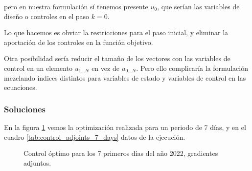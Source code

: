 pero en nuestra formulación sí tenemos presente $u_0$, que serían las variables
de diseño o controles en el paso $k=0$.

Lo que hacemos es obviar la restricciones para el paso inicial, y eliminar la
aportación de los controles en la función objetivo.

Otra posibilidad sería reducir el tamaño de los vectores con las variables de
control en un elemento $u_{1 \ldots N}$ en vez de $u_{0 \ldots N}$. Pero ello
complicaría la formulación mezclando índices distintos para variables de estado
y variables de control en las ecuaciones.


\subsubsection{Soluciones}

En la figura \ref{fig:control_adjoints_7_days} vemos la optimización realizada
para un periodo de 7 días, y en el cuadro \ref{tab:control_adjoints_7_days}
datos de la ejecución.

\begin{figure}[h] \centering
	\centering
	
	\caption{Control óptimo para los 7 primeros días del año 2022, gradientes adjuntos.}
	\label{fig:control_adjoints_7_days}
\end{figure}

